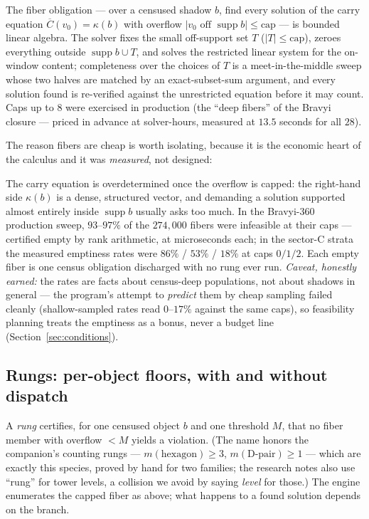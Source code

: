\documentclass[11pt]{article}
\theoremstyle{plain}
\theoremstyle{definition}
\theoremstyle{remark}
\newcommand{\suppop}{\operatorname{supp}}
\newcommand{\wt}[1]{\lvert #1\rvert}
\newcommand{\ov}[1]{\overline{#1}}
\begin{document}
The fiber obligation --- over a censused shadow $b$, find every solution
of the carry equation $\ov C(v_0) = \kappa(b)$ with overflow $\wt{v_0
\text{ off } \suppop b} \leq \mathrm{cap}$ --- is bounded linear algebra.
The solver fixes the small off-support set $T$ ($\lvert T\rvert \leq
\mathrm{cap}$), zeroes everything outside $\suppop b \cup T$, and solves
the restricted linear system for the on-window content; completeness over
the choices of $T$ is a meet-in-the-middle sweep whose two halves are
matched by an exact-subset-sum argument, and every solution found is
re-verified against the unrestricted equation before it may count. Caps
up to $8$ were exercised in production (the ``deep fibers'' of the
Bravyi closure --- priced in advance at solver-hours, measured at $13.5$
seconds for all $28$).

The reason fibers are cheap is worth isolating, because it is the
economic heart of the calculus and it was \emph{measured}, not designed:

\begin{keyidea}
The carry equation is overdetermined once the overflow is capped: the
right-hand side $\kappa(b)$ is a dense, structured vector, and demanding
a solution supported almost entirely inside $\suppop b$ usually asks too
much. In the Bravyi-360 production sweep, $93$--$97\%$ of the
$274{,}000$ fibers were infeasible at their caps --- certified empty by
rank arithmetic, at microseconds each; in the sector-C strata the
measured emptiness rates were $86\%$ / $53\%$ / $18\%$ at caps $0/1/2$.
Each empty fiber is one census obligation discharged with no rung ever
run. \emph{Caveat, honestly earned:} the rates are facts about
census-deep populations, not about shadows in general --- the program's
attempt to \emph{predict} them by cheap sampling failed cleanly
(shallow-sampled rates read $0$--$17\%$ against the same caps), so
feasibility planning treats the emptiness as a bonus, never a budget
line (Section~\ref{sec:conditions}).
\end{keyidea}

\subsection{Rungs: per-object floors, with and without dispatch}
\label{sec:rungs}

A \emph{rung} certifies, for one censused object $b$ and one threshold
$M$, that no fiber member with overflow $< M$ yields a violation. (The
name honors the companion's counting rungs --- $m(\text{hexagon}) \geq
3$, $m(\text{D-pair}) \geq 1$ --- which are exactly this species, proved
by hand for two families; the research notes also use ``rung'' for tower
levels, a collision we avoid by saying \emph{level} for those.) The
engine enumerates the capped fiber as above; what happens to a found
solution depends on the branch.
\end{document}
